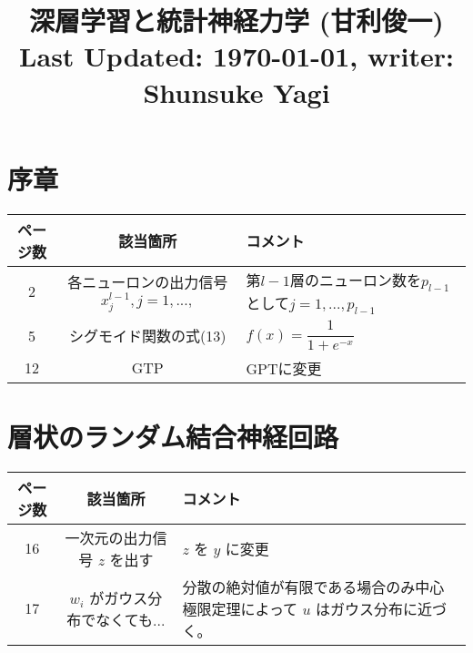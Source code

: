 \documentclass{jsarticle}
\title{深層学習と統計神経力学 (甘利俊一) \\[2ex] \large Last Updated: \today, \quad writer: Shunsuke Yagi}
\author{}
\date{}
\begin{document}
\setcounter{section}{-1}
\maketitle
\section{序章}
\begin{table}[H]
  \centering
  \begin{tabular}{|c|c|p{10 cm}|}
      \hline
      ページ数 & 該当箇所 & コメント \\ \hline
      2 & 各ニューロンの出力信号$x^{l-1}_j,j=1,...,$ & 第$l-1$層のニューロン数を$p_{l-1}$として$j=1,...,p_{l-1}$ \\ \hline
      5 & シグモイド関数の式(13) & $f(x)=\dfrac{1}{1+e^{-x}}$ \\ \hline
      12 & GTP & GPTに変更 \\ \hline
  \end{tabular}
  \label{tab:pro}
\end{table}
\section{層状のランダム結合神経回路}
\begin{table}[H]
  \centering
  \begin{tabular}{|c|c|p{10 cm}|}
      \hline
      ページ数 & 該当箇所 & コメント \\ \hline
      16 & 一次元の出力信号 $z$ を出す & $z$ を $y$ に変更 \\ \hline
      17 & $w_i$ がガウス分布でなくても... & 分散の絶対値が有限である場合のみ中心極限定理によって $u$ はガウス分布に近づく。 \\ \hline
  \end{tabular}
  \label{tab:mem}
\end{table}
\end{document}
